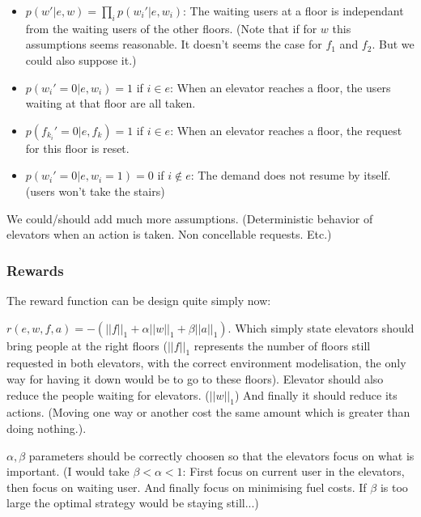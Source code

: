 \documentclass[a4paper]{article}
\begin{document}
\begin{itemize}
    \item $p(w'|e, w) = \prod_i p(w_i'|e, w_i)$: The waiting users at a floor is independant from the waiting users of the other floors. (Note that if for $w$
          this assumptions seems reasonable. It doesn't seems the case for $f_1$ and $f_2$. But we could also suppose it.)
    \item $p(w_i' = 0|e, w_i) = 1$ if $i \in e$: When an elevator reaches a floor, the users waiting at that floor are all taken.
    \item $p(f_{k_i}' = 0|e, f_k) = 1$ if $i \in e$: When an elevator reaches a floor, the request for this floor is reset.
    \item $p(w_i' = 0|e, w_i=1) = 0$ if $i \notin e$: The demand does not resume by itself. (users won't take the stairs)
\end{itemize}

We could/should add much more assumptions. (Deterministic behavior of elevators when an action is taken. Non concellable requests. Etc.)

\subsubsection*{Rewards}
The reward function can be design quite simply now:

$r(e, w, f, a) = - (||f||_1 + \alpha ||w||_1 + \beta ||a||_1)$. Which simply state elevators should bring people at the right floors ($||f||_1$ represents
the number of floors still requested in both elevators, with the correct environment modelisation, the only way for having it down would be to go to these
floors). Elevator should also reduce the people waiting for elevators. ($||w||_1$) And finally it should reduce its
actions. (Moving one way or another cost the same amount which is greater than doing nothing.).

$\alpha, \beta$ parameters should be correctly choosen so that the elevators focus on what is important. (I would take $\beta < \alpha < 1$: First focus on
current user in the elevators, then focus on waiting user. And finally focus on minimising fuel costs. If $\beta$ is too large the optimal strategy would be
staying still...)
\end{document}
